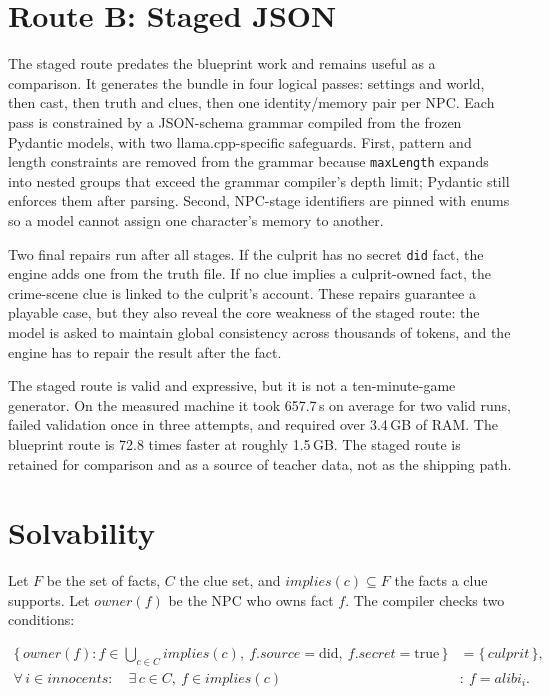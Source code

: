 ﻿\documentclass[11pt,a4paper]{report}
\begin{document}
\section{Route B: Staged JSON}
The staged route predates the blueprint work and remains useful as a comparison. It generates the bundle in four logical passes: settings and world, then cast, then truth and clues, then one identity/memory pair per NPC. Each pass is constrained by a JSON-schema grammar compiled from the frozen Pydantic models, with two llama.cpp-specific safeguards. First, pattern and length constraints are removed from the grammar because \texttt{maxLength} expands into nested groups that exceed the grammar compiler's depth limit; Pydantic still enforces them after parsing. Second, NPC-stage identifiers are pinned with enums so a model cannot assign one character's memory to another.

Two final repairs run after all stages. If the culprit has no secret \texttt{did} fact, the engine adds one from the truth file. If no clue implies a culprit-owned fact, the crime-scene clue is linked to the culprit's account. These repairs guarantee a playable case, but they also reveal the core weakness of the staged route: the model is asked to maintain global consistency across thousands of tokens, and the engine has to repair the result after the fact.

\begin{warnbox}
The staged route is valid and expressive, but it is not a ten-minute-game generator. On the measured machine it took 657.7\,s on average for two valid runs, failed validation once in three attempts, and required over 3.4\,GB of RAM. The blueprint route is 72.8 times faster at roughly 1.5\,GB. The staged route is retained for comparison and as a source of teacher data, not as the shipping path.
\end{warnbox}

\section{Solvability}
\label{sec:solvability}
Let $F$ be the set of facts, $C$ the clue set, and $\mathit{implies}(c)\subseteq F$ the facts a clue supports. Let $\mathit{owner}(f)$ be the NPC who owns fact $f$. The compiler checks two conditions:

\begin{align}
  \{\, \mathit{owner}(f) : f \in \textstyle\bigcup_{c\in C}\mathit{implies}(c),\ f.\mathit{source}=\text{did},\ f.\mathit{secret}=\text{true} \,\} &= \{\, \mathit{culprit} \,\}, \\
  \forall\, i \in \mathit{innocents}:\quad \exists\, c\in C,\ f\in\mathit{implies}(c) &: \ f=\mathit{alibi}_i .
\end{align}
\end{document}
